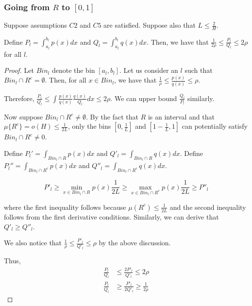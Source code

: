 \subsubsection{Going from $R$ to $[0,1]$}


\begin{proposition}
\label{prop:pq_ratio_bound1}
Suppose assumptions $C2$ and $C5$ are satisfied. Suppose also that $L \leq \frac{2}{H}$.

Define $P_l = \int_{a_l}^{b_l} p(x) dx$ and $Q_l = \int_{a_l}^{b_l} q(x)dx$. 
Then, we have that $\frac{1}{2 \rho} \leq \frac{P_l}{Q_l} \leq 2\rho$ for all $l$. 
\end{proposition}


\begin{proof}

Let $Bin_l$ denote the bin $[a_l, b_l]$. Let us consider an $l$ such that $Bin_l \cap R^c = \emptyset$. Then, for all $x \in Bin_l$, we have that 
$\frac{1}{\rho} \leq \frac{p(x)}{q(x)} \leq \rho$.

Therefore, $\frac{P_l}{Q_l} \leq \int \frac{p(x)}{q(x)} \frac{q(x)}{Q_l} dx \leq 2\rho$. We can upper bound $\frac{Q_l}{P_l}$ similarly. 

Now suppose $Bin_l \cap R^c \neq \emptyset$. By the fact that $R$ is an interval and that $\mu\{R^c\} = o(H) \leq \frac{1}{2L}$, only the bins $[0, \frac{1}{L}]$ and $[1-\frac{1}{L}, 1]$ can potentially satisfy $Bin_l \cap R^c \neq 0$. 

Define $P_l' = \int_{Bin_l \cap R} p(x) dx$ and $Q'_l = \int_{Bin_l \cap R} q(x) dx$. Define $P_l'' = \int_{Bin_l \cap R^c} p(x) dx$ and $Q''_l = \int_{Bin_l \cap R^c} q(x) dx$.


\[
P'_l \geq \min_{x \in Bin_l \cap R} p(x) \frac{1}{2L} \geq \max_{x \in Bin_l \cap R^c} p(x) \frac{1}{2L} \geq P''_l
\]

where the first inequality follows because $\mu(R^c) \leq \frac{1}{2L}$ and the second inequality follows from the first derivative conditions. Similarly, we can derive that $Q'_l \geq Q''_l$. 

We also notice that $\frac{1}{\rho} \leq \frac{P'_l}{Q'_l} \leq \rho$ by the above discussion. 

Thus,
\begin{align*}
\frac{P_l}{Q_l} &\leq \frac{2 P'_l}{ Q'_l} \leq 2\rho \\
\frac{P_l}{Q_l} &\geq \frac{P'_l}{2 Q'_l} \geq \frac{1}{2\rho}
\end{align*}

\end{proof}





